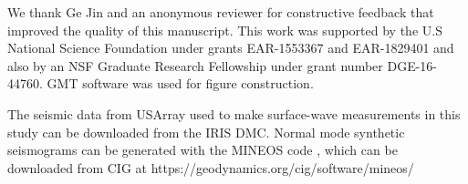 \documentclass[extra,mreferee]{gji}
\begin{document}
\newpage 

\begin{acknowledgments}
We thank Ge Jin and an anonymous reviewer for constructive feedback that improved the quality of this manuscript.  This work was supported by the U.S National Science Foundation under grants EAR-1553367 and EAR-1829401 and also by an NSF Graduate Research Fellowship under grant number DGE-16-44760. GMT software \citep{wessel1998new} was used for figure construction.
\end{acknowledgments}

\begin{dataavailability}
The seismic data from USArray used to make surface-wave measurements in this study can be downloaded from the IRIS DMC. Normal mode synthetic seismograms can be generated with the MINEOS code \citep{mineosbro}, which can be downloaded from CIG at https://geodynamics.org/cig/software/mineos/
\end{dataavailability}





\label{lastpage}
\end{document}
